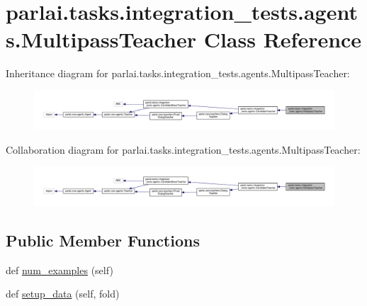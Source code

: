\hypertarget{classparlai_1_1tasks_1_1integration__tests_1_1agents_1_1MultipassTeacher}{}\section{parlai.\+tasks.\+integration\+\_\+tests.\+agents.\+Multipass\+Teacher Class Reference}
\label{classparlai_1_1tasks_1_1integration__tests_1_1agents_1_1MultipassTeacher}


Inheritance diagram for parlai.\+tasks.\+integration\+\_\+tests.\+agents.\+Multipass\+Teacher\+:\nopagebreak
\begin{figure}[H]
\begin{center}
\leavevmode
\includegraphics[width=350pt]{d1/d90/classparlai_1_1tasks_1_1integration__tests_1_1agents_1_1MultipassTeacher__inherit__graph}
\end{center}
\end{figure}


Collaboration diagram for parlai.\+tasks.\+integration\+\_\+tests.\+agents.\+Multipass\+Teacher\+:\nopagebreak
\begin{figure}[H]
\begin{center}
\leavevmode
\includegraphics[width=350pt]{da/d6a/classparlai_1_1tasks_1_1integration__tests_1_1agents_1_1MultipassTeacher__coll__graph}
\end{center}
\end{figure}
\subsection*{Public Member Functions}
\begin{DoxyCompactItemize}
\item 
def \hyperlink{classparlai_1_1tasks_1_1integration__tests_1_1agents_1_1MultipassTeacher_ae940c091daf534981c1cb5f42e38e8b2}{num\+\_\+examples} (self)
\item 
def \hyperlink{classparlai_1_1tasks_1_1integration__tests_1_1agents_1_1MultipassTeacher_a8f00304abda0184bc641db17143a6204}{setup\+\_\+data} (self, fold)
\end{DoxyCompactItemize}
